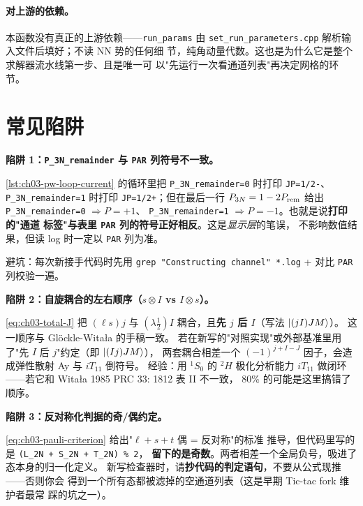 \paragraph{对上游的依赖。}
本函数没有真正的上游依赖——\texttt{run\_params} 由
\texttt{set\_run\_parameters.cpp} 解析输入文件后填好；不读 NN 势的任何细
节，纯角动量代数。这也是为什么它是整个求解器流水线第一步、且是唯一可
以"先运行一次看通道列表"再决定网格的环节。

\section{常见陷阱}
\label{sec:ch03-pitfalls}

\begin{pitfallbox}[label={box:ch03-pitfall-pi-print}]
\textbf{陷阱 1：\texttt{P\_3N\_remainder} 与 \texttt{PAR} 列符号不一致。}

\cref{lst:ch03-pw-loop-current} 的循环里把 \verb|P_3N_remainder=0| 时打印
\verb|JP=1/2-|、\verb|P_3N_remainder=1| 时打印 \verb|JP=1/2+|；但在最后一行
\(P_{3N} = 1 - 2 P_{\rm rem}\) 给出 \verb|P_3N_remainder=0| \(\Rightarrow P = +1\)、
\verb|P_3N_remainder=1| \(\Rightarrow P = -1\)。也就是说\textbf{打印的"通道
标签"与表里 \texttt{PAR} 列的符号正好相反}。这是\emph{显示层}的笔误，
不影响数值结果，但读 log 时一定以 \texttt{PAR} 列为准。

避坑：每次新接手代码时先用
\verb|grep "Constructing channel" *.log| + 对比 \texttt{PAR} 列校验一遍。
\end{pitfallbox}

\begin{pitfallbox}
\textbf{陷阱 2：自旋耦合的左右顺序（\(s \otimes I\) vs \(I \otimes s\)）。}

\cref{eq:ch03-total-J} 把 \((\ell s)j\) 与 \((\lambda \tfrac{1}{2}) I\) 耦合，且\textbf{先 \(j\) 后 \(I\)}（写法 \(\ket{(jI)JM}\)）。
这一顺序与 Glöckle-Witała 的手稿一致。
若在新写的"对照实现"或外部基准里用了"先 \(I\) 后 \(j\)"约定（即 \(\ket{(Ij)JM}\)），
两套耦合相差一个 \((-1)^{j+I-J}\) 因子，会造成弹性散射 Ay 与 \(iT_{11}\) 倒符号。
经验：用 \({}^1S_0\) 的 \({}^2H\) 极化分析能力 \(iT_{11}\)
做闭环——若它和 Witała 1985 PRC 33: 1812 表 II 不一致，
80\% 的可能是这里搞错了顺序。
\end{pitfallbox}

\begin{pitfallbox}
\textbf{陷阱 3：反对称化判据的奇/偶约定。}

\cref{eq:ch03-pauli-criterion} 给出"\(\ell + s + t\) 偶 = 反对称"的标准
推导，但代码里写的是 \verb|(L_2N + S_2N + T_2N) % 2|，
\textbf{留下的是奇数}。两者相差一个全局负号，吸进了态本身的归一化定义。
新写检查器时，请\textbf{抄代码的判定语句}，不要从公式现推——否则你会
得到一个所有态都被滤掉的空通道列表（这是早期 Tic-tac fork 维护者最常
踩的坑之一）。
\end{pitfallbox}

